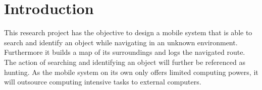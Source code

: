 \cleardoublepage
\pagestyle{fancy} %
\fancyhead{}
\fancyhf{}
\renewcommand{\headrulewidth}{0pt}
\renewcommand{\footrulewidth}{0.4pt}

\section{Introduction}

This research project has the objective to design a mobile system that is able to search and identify an object while navigating in an unknown environment. Furthermore it builds a map of its surroundings and logs the navigated route. The action of searching and identifying an object will further be referenced as hunting. As the mobile system on its own only offers limited computing powers, it will outsource computing intensive tasks to external computers. 
